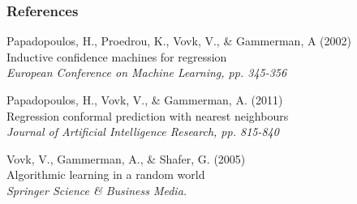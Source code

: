 \documentclass{beamer}
\begin{document}
\begin{frame}
\frametitle{References}
\footnotesize{
	\begin{thebibliography}{99} %
				
		 Papadopoulos, H., Proedrou, K., Vovk, V., \& Gammerman, A (2002)\\
		\newblock Inductive confidence machines for regression \\
		\newblock \emph{European Conference on Machine Learning, pp. 345-356}		
		
		 Papadopoulos, H., Vovk, V., \& Gammerman, A. (2011) \\
		\newblock Regression conformal prediction with nearest neighbours \\
		\newblock \emph{Journal of Artificial Intelligence Research, pp. 815-840}		
		
		 Vovk, V., Gammerman, A., \& Shafer, G. (2005) \\
		\newblock Algorithmic learning in a random world \\
		\newblock \emph{Springer Science \& Business Media.}
		
	\end{thebibliography}
}
\end{frame}
    
\end{document}
